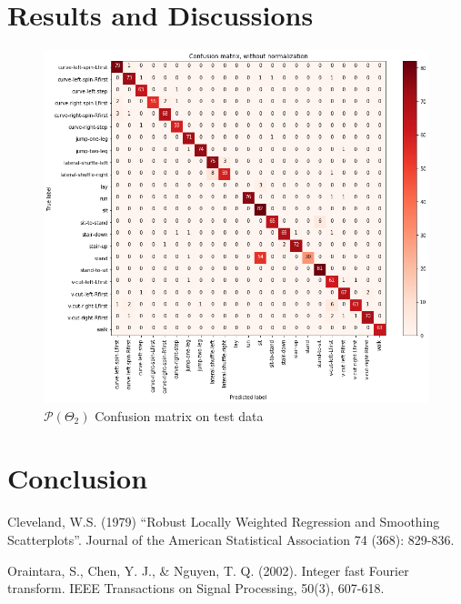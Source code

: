 \section{Results and Discussions}




\begin{figure}[htpb!]
	\centering 
	\includegraphics[width=\textwidth]{images/conf_ma.png}
	\caption{$\mathcal{P}(\Theta_{2})$  Confusion matrix on test data} 
	\label{fig:confusion} 
\end{figure}

\section{Conclusion}



\begin{thebibliography}{1}
Cleveland, W.S. (1979) “Robust Locally Weighted Regression and Smoothing Scatterplots”. Journal of the American Statistical Association 74 (368): 829-836.

Oraintara, S., Chen, Y. J., \& Nguyen, T. Q. (2002). Integer fast Fourier transform. IEEE Transactions on Signal Processing, 50(3), 607-618.

\end{thebibliography}

